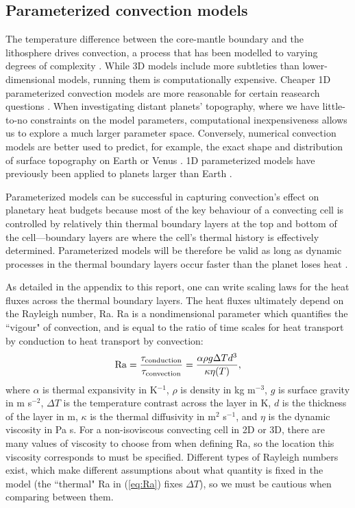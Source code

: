 \subsection{Parameterized convection models}

The temperature difference between the core-mantle boundary and the lithosphere drives convection, a process that has been modelled to varying degrees of complexity \citep[e.g.,][]{McKenzie1974, Nakagawa2015}. While 3D models include more subtleties than lower-dimensional models, running them is computationally expensive. Cheaper 1D parameterized convection models are more reasonable for certain reasearch questions \citep{Sharpe1979, Schubert1980, Davies1980}. When investigating distant planets' topography, where we have little-to-no constraints on the model parameters, computational inexpensiveness allows us to explore a much larger parameter space. Conversely, numerical convection models are better used to predict, for example, the exact shape and distribution of surface topography on Earth or Venus \citep[e.g.,][]{Moresi1995, Vezolainen2004}. 1D parameterized models have previously been applied to planets larger than Earth \citep{Valencia2009, Stamenkovic2012}.

Parameterized models can be successful in capturing convection's effect on planetary heat budgets because most of the key behaviour of a convecting cell is controlled by relatively thin thermal boundary layers at the top and bottom of the cell---boundary layers are where the cell's thermal history is effectively determined. Parameterized models will be therefore be valid as long as dynamic processes in the thermal boundary layers occur faster than the planet loses heat \citep{Sharpe1979, Korenaga2008a}. 

As detailed in the appendix to this report, one can write scaling laws for the heat fluxes across the thermal boundary layers. The heat fluxes ultimately depend on the Rayleigh number, Ra. Ra is a nondimensional parameter which quantifies the ``vigour" of convection, and is equal to the ratio of time scales for heat transport by conduction to heat transport by convection:
\begin{equation}\label{eq:Ra}
\mathrm{Ra} = \frac{\tau_{\rm conduction}}{\tau_{\rm convection}}= \frac{\alpha \rho g \Delta T d^3 }{ \kappa \eta(T)},
\end{equation}
where $\alpha$ is thermal expansivity in K$^{-1}$, $\rho$ is density in kg m$^{-3}$, $g$ is surface gravity in m s$^{-2}$, $\Delta T$ is the temperature contrast across the layer in K, $d$ is the thickness of the layer in m, $\kappa$ is the thermal diffusivity in m$^{2}$ s$^{-1}$, and $\eta$ is the dynamic viscosity in Pa s. For a non-isoviscous convecting cell in 2D or 3D, there are many values of viscosity to choose from when defining Ra, so the location this viscosity corresponds to must be specified. Different types of Rayleigh numbers exist, which make different assumptions about what quantity is fixed in the model (the ``thermal" Ra in (\ref{eq:Ra}) fixes $\Delta T$), so we must be cautious when comparing between them.

